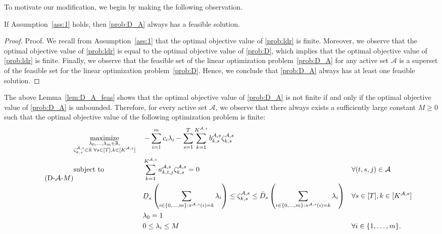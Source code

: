 \documentclass[nonblindrev,mnsc]{informs3} %
\def\Real{\mathbb{R}}
\let\R\Real
\newcommand{\ubar}[1]{\text{\b{$#1$}}}
\begin{document}
\begin{APPENDICES}
To motivate our modification, we begin by making the following observation.
\begin{lemma}\label{lem:D_A_feas}
If Assumption~\ref{ass:1} holds, then \eqref{prob:D_A} always has a feasible solution. 
\end{lemma}

\begin{proof}{Proof.}
We recall from  Assumption~\ref{ass:1} that the optimal objective value of \eqref{prob:ldr} is finite.  Moreover, we observe that the optimal objective value of \eqref{prob:ldr} is equal to the optimal objective value of \eqref{prob:D}, which implies that the optimal objective value of \eqref{prob:ldr} is finite. Finally, we observe that the feasible set of the linear optimization problem~\eqref{prob:D_A} for any active set $\mathcal{A}$ is a superset of the feasible set for the linear optimization problem~\eqref{prob:D}. Hence, we conclude that \eqref{prob:D_A} always has at least one feasible solution. 
\halmos \end{proof}

The above Lemma~\ref{lem:D_A_feas} shows that the optimal objective value of \eqref{prob:D_A} is not finite if and only if the optimal objective value of \eqref{prob:D_A} is unbounded. Therefore, for every active set $\mathcal{A}$, we observe that there  always exists a sufficiently large constant $M \ge 0$ such that the optimal objective value of the following optimization problem is finite:
{\small
\begin{equation}  \label{prob:D_A_M} \tag{D-$\mathcal{A}$-$M$}
\begin{aligned}
&\underset{ \substack{
\lambda_0,\ldots,\lambda_m \in \R, \\
\zeta^{\mathcal{A},s}_{k,s} \in \R \; \forall s \in [T], k \in [K^{\mathcal{A},s}]}}{\textnormal{maximize}}&& - \sum_{i=1}^m c_i \lambda_i -  \sum_{s=1}^T  \sum_{k=1}^{K^{\mathcal{A},s}} b^{\mathcal{A},s}_{k,s} \zeta^{\mathcal{A},s}_{k,s}  \\
&\textnormal{subject to}&& \begin{aligned}[t]
&\sum_{k=1}^{K^{\mathcal{A},s}}  a^{\mathcal{A},s}_{k,t,j}  \zeta^{\mathcal{A},s}_{k,s}   = 0 && \forall (t,s,j) \in \mathcal{A} \\
&  \ubar{D}_s \left( \sum_{i \in \{0,\ldots,m\}: \pi^{\mathcal{A},s}(i) = k} \lambda_{i} \right)   \le \zeta^{\mathcal{A},s}_{k,s}  \le \bar{D}_s \left( \sum_{i \in \{0,\ldots,m\}: \pi^{\mathcal{A},s}(i) = k} \lambda_{i} \right)  && \forall  s \in [T], k \in [ K^{\mathcal{A},s}]\\
& \lambda_0 = 1 \\
&0 \le \lambda_i \le M && \forall i \in \{1,\ldots,m\}. 
\end{aligned}
\end{aligned} 
\end{equation}
}%


\end{APPENDICES}
\end{document}
